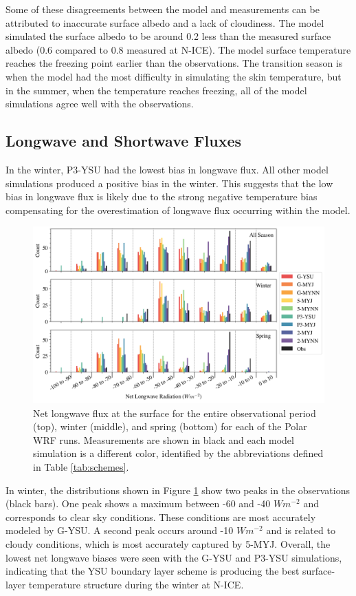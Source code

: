 Some of these disagreements between the model and measurements can be attributed to inaccurate surface albedo and a lack of cloudiness. The model simulated the surface albedo to be around 0.2 less than the measured surface albedo (0.6 compared to 0.8 measured at N-ICE). The model surface temperature reaches the freezing point earlier than the observations. The transition season is when the model had the most difficulty in simulating the skin temperature, but in the summer, when the temperature reaches freezing, all of the model simulations agree well with the observations. 

\subsection{Longwave and Shortwave Fluxes}
In the winter, P3-YSU had the lowest bias in longwave flux. All other model simulations produced a positive bias in the winter. This suggests that the low bias in longwave flux is likely due to the strong negative temperature bias compensating for the overestimation of longwave flux occurring within the model. 

  \begin{figure}[t]
    \centering
    \includegraphics[width=1\linewidth]{figures/chapter3/WRF_NetLW_Histo.png}
    \caption[Polar WRF simulated net longwave flux histograms.]{Net longwave flux at the surface for the entire observational period (top), winter (middle), and spring (bottom) for each of the Polar WRF runs. Measurements are shown in black and each model simulation is a different color, identified by the abbreviations defined in Table \ref{tab:schemes}.}
    \label{fig:wrf_netlw}
\end{figure}

 In winter, the distributions shown in Figure \ref{fig:wrf_netlw} show two peaks in the observations (black bars). One peak shows a maximum between -60 and -40 $Wm^{-2}$ and corresponds to clear sky conditions. These conditions are most accurately modeled by G-YSU. A second peak occurs around -10 $Wm^{-2}$ and is related to cloudy conditions, which is most accurately captured by 5-MYJ. Overall, the lowest net longwave biases were seen with the G-YSU and P3-YSU simulations, indicating that the YSU boundary layer scheme is producing the best surface-layer temperature structure during the winter at N-ICE. 
 

